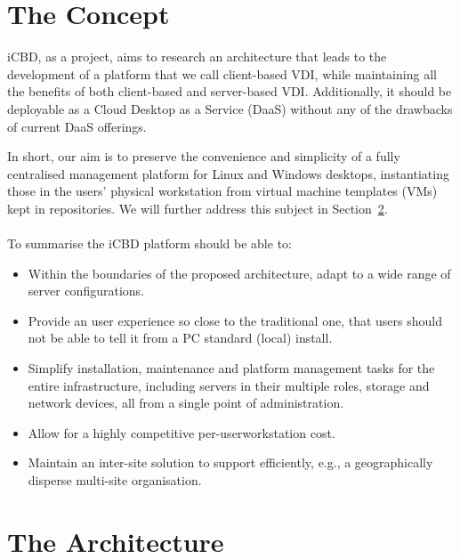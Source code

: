 \section{The Concept} %
\label{sec:icbd_concept}

iCBD, as a project, aims to research an architecture that leads to the development of a platform that we call client-based VDI, while maintaining all the benefits of both client-based and server-based VDI. Additionally, it should be deployable as a Cloud Desktop as a Service (DaaS) without any of the drawbacks of current DaaS offerings.

In short, our aim is to preserve the convenience and simplicity of a fully centralised management
platform for Linux and Windows desktops, instantiating those in the users' physical workstation from virtual machine templates (VMs) kept in repositories. We will further address this subject in Section~\ref{sec:icbd_architecture}.
\\
\\
To summarise the iCBD platform should be able to:

\begin{itemize}
	\item Within the boundaries of the proposed architecture, adapt to a wide range of server configurations.
	\item Provide an user experience so close to the traditional one, that users should not be able to tell it from a PC standard (local) install.
	\item Simplify installation, maintenance and platform management tasks for the entire infrastructure, including servers in their multiple roles, storage and network devices, all from a single point of administration.
	\item Allow for a highly competitive per-user\/workstation cost.
	\item Maintain an inter-site solution to support efficiently, e.g., a geographically disperse multi-site organisation.
\end{itemize}


\section{The Architecture} %
\label{sec:icbd_architecture}

